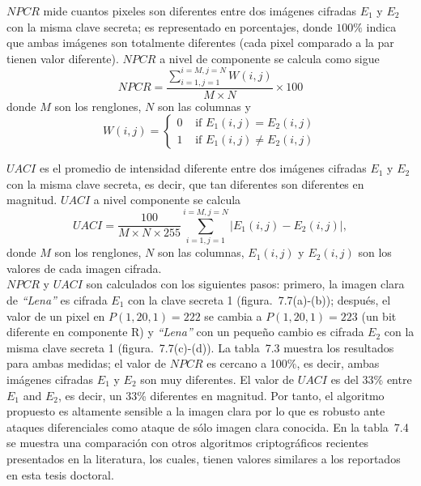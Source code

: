 $NPCR$ mide cuantos pixeles son diferentes entre dos imágenes cifradas $E_{1}$ y $E_{2}$ con la misma clave secreta; es representado en porcentajes, donde $100\%$ indica que ambas imágenes son totalmente diferentes (cada pixel comparado a la par tienen valor diferente). $NPCR$ a nivel de componente se calcula como sigue
\begin{equation}
NPCR=\frac{\sum_{i=1,j=1}^{i=M,j=N}W(i,j)}{M\times N} \times 100
\end{equation}
donde $M$ son los renglones, $N$ son las columnas y
\begin{equation}
W(i,j) = \left\{ \begin{array}{rl}
 0 &\mbox{ if $E_{1}(i,j)=E_{2}(i,j)$} \\
 1 &\mbox{ if $E_{1}(i,j)\neq E_{2}(i,j)$}
       \end{array} \right.
\end{equation}

$UACI$ es el promedio de intensidad diferente entre dos imágenes cifradas $E_{1}$ y $E_{2}$ con la misma clave secreta, es decir, que tan diferentes son diferentes en magnitud. $UACI$ a nivel componente se calcula
\begin{equation}
UACI=\frac{100}{M\times N\times 255}\sum_{i=1,j=1}^{i=M,j=N}|E_{1}(i,j)-E_{2}(i,j)|,
\end{equation}
donde $M$ son los renglones, $N$ son las columnas,  $E_{1}(i,j)$ y $E_{2}(i,j)$ son los valores de cada imagen cifrada.  \\ 

$NPCR$ y $UACI$ son calculados con los siguientes pasos: primero, la imagen clara de \textit{``Lena''} es cifrada $E_{1}$ con la clave secreta 1 (figura.~7.7(a)-(b)); después, el valor de un pixel en $P(1,20,1)=222$ se cambia a $P(1,20,1)=223$ (un bit diferente en componente R) y \textit{``Lena''} con un pequeño cambio es cifrada $E_{2}$ con la misma clave secreta 1 (figura.~7.7(c)-(d)). La tabla~7.3 muestra los resultados para ambas medidas; el valor de $NPCR$ es cercano a 100\%, es decir, ambas imágenes cifradas $E_{1}$ y $E_{2}$ son muy diferentes. El valor de $UACI$ es del 33\% entre $E_{1}$ and $E_{2}$, es decir, un 33\% diferentes en magnitud. Por tanto, el algoritmo propuesto es altamente sensible a la imagen clara por lo que es robusto ante ataques diferenciales como ataque de sólo imagen clara conocida. En la tabla~7.4 se muestra una comparación con otros algoritmos criptográficos recientes presentados en la literatura, los cuales, tienen valores similares a los reportados en esta tesis doctoral.   

